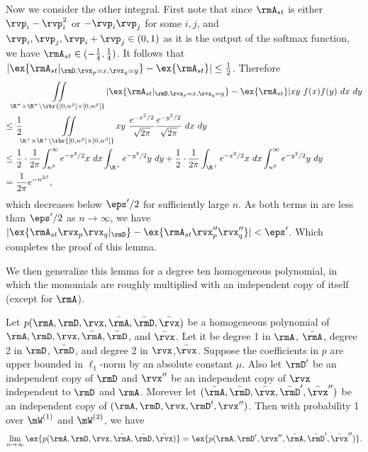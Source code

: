 \begin{proofof}{}
\begin{equation}
\end{equation}
Now we consider the other integral. First note that since $\rmA_{st}$ is either $\rvp_i-\rvp_i^2$ or $-\rvp_i\rvp_j$ for some $i,j$, and $\rvp_i,\rvp_j, \rvp_i+\rvp_j\in(0,1)$ as it is the output of the softmax function, we have $\rmA_{st}\in(-\frac14, \frac14)$. It follows that $|\ex{\rmA_{st}|_{\rmD, \rvx_p=x,\rvx_q=y}}-\ex{\rmA_{st}}|\leq\frac12$. Therefore
\begin{equation}
\begin{split}
&\iint\limits_{\R^+\times\R^+\backslash\rbr{[0,n^\beta]\times [0,n^\beta]}} |\ex{\rmA_{st}|_{\rmD, \rvx_p=x,\rvx_q=y}}-\ex{\rmA_{st}}|xy\ f(x)f(y)\ dx\ dy\\
\leq &\ \frac12\iint\limits_{\R^+\times\R^+\backslash\rbr{[0,n^\beta]\times [0,n^\beta]}}xy\ \frac{e^{-x^2/2}}{\sqrt{2\pi}}\frac{e^{-y^2/2}}{\sqrt{2\pi}}\ dx\ dy\\
\leq&\ \frac12\cdot\frac{1}{2\pi}\int_{n^\beta}^\infty e^{-x^2/2}x\ dx\int_{\R^+}e^{-y^2/2}y\ dy + \frac12\cdot\frac{1}{2\pi}\int_{\R^+} e^{-x^2/2}x\ dx\int_{n^\beta}^{\infty}e^{-y^2/2}y\ dy\\
=&\ \frac{1}{2\pi}e^{-n^{2\beta}},
\end{split}
\end{equation}
which decreases below $\eps'/2$ for sufficiently large $n$. As both terms in  are less than $\eps'/2$ as $n\to\infty$, we have $|\ex{\rmA_{st}\rvx_p\rvx_q|_\rmD}-\ex{\rmA_{st}\rvx''_p\rvx''_q}|<\eps'$. Which completes the proof of this lemma.
\end{proofof}

We then generalize this lemma for a degree ten homogeneous polynomial, in which the monomials are roughly multiplied with an independent copy of itself (except for $\rmA$).
\begin{corollary}
\label{cor:polynomial}
Let $p(\rmA,\rmD,\rvx,\bar\rmA,\bar\rmD,\bar\rvx)$ be a homogeneous polynomial of $\rmA,\rmD,\rvx,\bar\rmA,\bar\rmD$, and $\bar\rvx$. Let it be degree 1 in $\rmA$, $\bar\rmA$, degree 2 in $\rmD$, $\bar\rmD$, and degree 2 in $\rvx$,$\bar\rvx$. Suppose the coefficients in $p$ are upper bounded in $\ell_1$-norm by an absolute constant $\mu$. Also let $\rmD'$ be an independent copy of $\rmD$ and $\rvx''$ be an independent copy of $\rvx$ independent to $\rmD$ and $\rmA$. Morever let $(\bar\rmA,\bar\rmD,\bar\rvx,\bar\rmD',\bar\rvx'')$ be an independent copy of $(\rmA,\rmD,\rvx,\rmD',\rvx'')$. Then with probability 1 over $\mW^{(1)}$ and $\mW^{(2)}$, we have
\begin{equation}
    \lim_{n\to\infty}\ex{p(\rmA, \rmD, \rvx, \bar\rmA, \bar\rmD, \bar\rvx)} = \ex{p(\rmA, \rmD', \rvx'', \bar\rmA, \bar\rmD', \bar\rvx'')}.
\end{equation}
\end{corollary}

